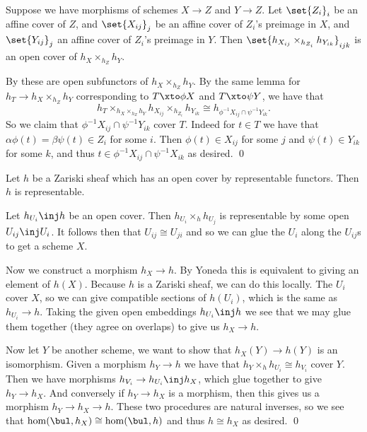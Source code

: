 \edefn

\blemm[name={pullbackcover}]

    Suppose we have morphisms of schemes $X\to Z$ and $Y\to Z$.
    Let $\set{Z_i}_i$ be an affine cover of $Z$, and $\set{X_{ij}}_j$ be an affine cover of $Z_i$'s
    preimage in $X$, and $\set{Y_{ij}}_j$ an affine cover of $Z_i$'s preimage in $Y$.
    Then $\set{h_{X_{ij}}\times_{h_{Z_i}}h_{Y_{ik}}}_{ijk}$ is an open cover of $h_X\times_{h_Z}h_Y$.

\elemm

\bproof

    By  these are open subfunctors of $h_X\times_{h_Z}h_Y$.
    By the same lemma for $h_T\to h_X\times_{h_Z}h_Y$ corresponding to $T\xto\phi X$ and $T\xto\psi Y$,
    we have that
    $$ h_T\times_{h_X\times_{h_Z}h_Y}h_{X_{ij}}\times_{h_{Z_i}}h_{Y_{ik}}\cong
    h_{\phi^{-1}X_{ij}\cap\psi^{-1}Y_{ik}} . $$
    So we claim that $\phi^{-1}X_{ij}\cap\psi^{-1}Y_{ik}$ cover $T$.
    Indeed for $t\in T$ we have that $\alpha\phi(t)=\beta\psi(t)\in Z_i$ for some $i$.
    Then $\phi(t)\in X_{ij}$ for some $j$ and $\psi(t)\in Y_{ik}$ for some $k$, and thus
    $t\in\phi^{-1}X_{ij}\cap\psi^{-1}X_{ik}$ as desired.
    \qed

\eproof

\blemm

    Let $h$ be a Zariski sheaf which has an open cover by representable functors.
    Then $h$ is representable.

\elemm

\bproof

    Let $h_{U_i}\inj h$ be an open cover.
    Then $h_{U_i}\times_hh_{U_j}$ is representable by some open $U_{ij}\inj U_i$.
    It follows then that $U_{ij}\cong U_{ji}$ and so we can glue the $U_i$ along the $U_{ij}$s to get a
    scheme $X$.

    Now we construct a morphism $h_X\to h$.
    By Yoneda this is equivalent to giving an element of $h(X)$.
    Because $h$ is a Zariski sheaf, we can do this locally.
    The $U_i$ cover $X$, so we can give compatible sections of $h(U_i)$, which is the same as
    $h_{U_i}\to h$.
    Taking the given open embeddings $h_{U_i}\inj h$ we see that we may glue them together (they agree
    on overlaps) to give us $h_X\to h$.

    Now let $Y$ be another scheme, we want to show that $h_X(Y)\to h(Y)$ is an isomorphism.
    Given a morphism $h_Y\to h$ we have that $h_Y\times_hh_{U_i}\cong h_{V_i}$ cover $Y$.
    Then we have morphisms $h_{V_i}\to h_{U_i}\inj h_X$, which glue together to give $h_Y\to h_X$.
    And conversely if $h_Y\to h_X$ is a morphism, then this gives us a morphism $h_Y\to h_X\to h$.
    These two procedures are natural inverses, so we see that $\hom(\bul,h_X)\cong\hom(\bul,h)$
    and thus $h\cong h_X$ as desired.
    \qed

